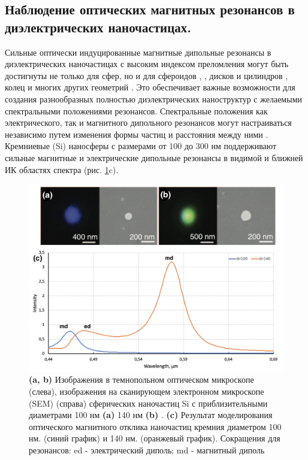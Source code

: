 \subsection*{Наблюдение оптических магнитных резонансов в диэлектрических наночастицах.}
\hspace*{2mm}
Сильные оптически индуцированные магнитные дипольные резонансы в диэлектрических наночастицах с высоким индексом преломления могут быть достигнуты не только для сфер, но и для сфероидов \cite{articleDirVi}, \cite{optScatShper}, дисков и цилиндров \cite{multLightScat}, колец \cite{contrMagnModes} и многих других геометрий \cite{nearInfrMR}. Это обеспечивает важные возможности для создания разнообразных полностью диэлектрических наноструктур с желаемыми спектральными положениями резонансов. Спектральные положения как электрического, так и магнитного дипольного резонансов могут настраиваться независимо путем изменения формы частиц и расстояния между ними \cite{optScatDeilectrHightIndex}.
\\
\hspace*{2mm}
Кремниевые (Si) наносферы с размерами от 100 до 300 нм поддерживают сильные магнитные и электрические дипольные резонансы в видимой и ближней ИК областях спектра (рис. \ref{fig2}c). 
 \begin{figure}[h]
	\centering
	\includegraphics[width=1\linewidth]{images/graph1.png}
	\caption{\textbf{(a, b)} Изображения в темнопольном оптическом микроскопе (слева), изображения на сканирующем электронном микроскопе (SEM) (справа)  сферических наночастиц Si с приблизительными диаметрами 100 нм \textbf{(a)} 140 нм \textbf{(b)} \cite{kuznetsov2012luk}. \textbf{(c)} Результат моделирования оптического магнитного отклика наночастиц кремния  диаметром 100 нм. (синий график) и 140 нм. (оранжевый график).  Сокращения для резонансов: ed - электрический диполь; md - магнитный диполь}
	\label{fig2}
\end{figure}
